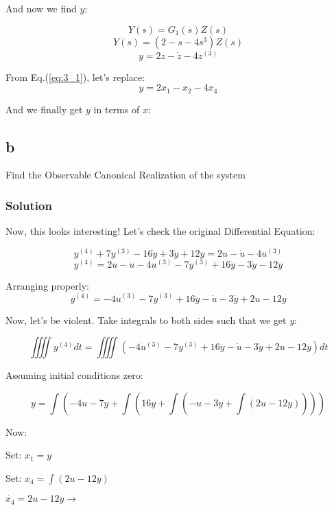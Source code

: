 \documentclass[10pt,a4paper]{article}
\begin{document}
And now we find $y$:

\[ Y(s) = G_{1}(s)Z(s) \]
\[ Y(s) = ( 2 - s - 4s^{3} )Z(s)\]
\[ y = 2z - \dot{z} - 4z^{(3)} \]

From Eq.(\ref{eq:3_1}), let's replace:
\[ y = 2x_{1} - x_{2} - 4x_{4} \]

And we finally get $y$ in terms of $x$:
\begin{center}
\end{center}


\subsection*{b}
Find the Observable Canonical Realization of the system
\subsubsection*{Solution}
Now, this looks interesting! Let's check the original Differential Equation:

\[ y^{(4)} + 7y^{(3)} - 16\ddot{y} + 3\dot{y} + 12y = 2u - \dot{u} - 4u^{(3)} \]
\[ y^{(4)} = 2u - \dot{u} - 4u^{(3)} -7y^{(3)} + 16\ddot{y} - 3\dot{y} - 12y  \]

Arranging properly:
\[ y^{(4)} = - 4u^{(3)} -7y^{(3)} + 16\ddot{y} - \dot{u} - 3\dot{y} + 2u - 12y  \]

Now, let's be violent. Take integrals to both sides such that we get $y$:

\[ \iiiint y^{(4)}dt = \iiiint (- 4u^{(3)} -7y^{(3)} + 16\ddot{y} - \dot{u} - 3\dot{y} + 2u - 12y )dt \]

Assuming initial conditions zero:

\[ y = \int \left ( -4u - 7y + \int \left ( 16y + \int \left ( -u-3y + \int (2u-12y) \right  ) \right ) \right ) \]

Now:
\smallskip

Set: $x_{1} = y$
\medskip

Set: $x_{4} = \int (2u-12y) $
\smallskip

$ \dot{x_{4}} = 2u-12y \rightarrow$ 
\medskip
\end{document}
